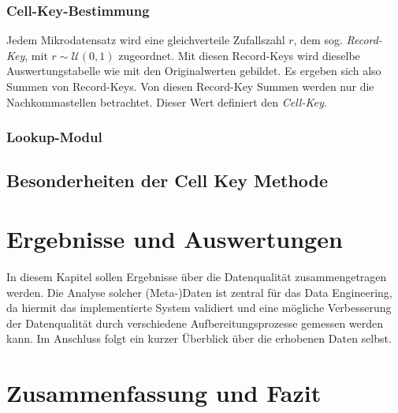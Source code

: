 \subsubsection{Cell-Key-Bestimmung}

Jedem Mikrodatensatz wird eine gleichverteile Zufallszahl $r$, dem sog. \textit{Record-Key}, mit $r \sim \mathcal{U}(0, 1)$ zugeordnet. Mit diesen Record-Keys wird dieselbe Auswertungstabelle wie mit den Originalwerten gebildet. Es ergeben sich also Summen von Record-Keys. Von diesen Record-Key Summen werden nur die Nachkommastellen betrachtet. Dieser Wert definiert den \textit{Cell-Key}.

\subsubsection{Lookup-Modul}

\subsection{Besonderheiten der Cell Key Methode}%



\section{Ergebnisse und Auswertungen}

In diesem Kapitel sollen Ergebnisse über die Datenqualität zusammengetragen werden. Die Analyse solcher (Meta-)Daten ist zentral für das Data Engineering, da hiermit das implementierte System validiert und eine mögliche Verbesserung der Datenqualität durch verschiedene Aufbereitungsprozesse gemessen werden kann. Im Anschluss folgt ein kurzer Überblick über die erhobenen Daten selbst.



\section{Zusammenfassung und Fazit}

